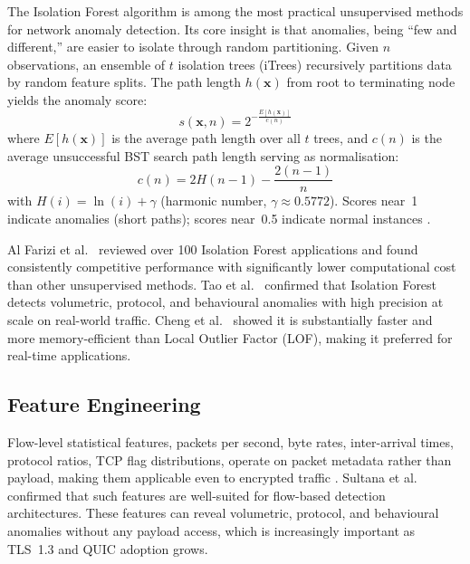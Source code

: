 \documentclass[conference]{IEEEtran}
\begin{document}
The Isolation Forest algorithm \cite{liu2008isolation} is among the most practical unsupervised methods for network anomaly detection. Its core insight is that anomalies, being ``few and different,'' are easier to isolate through random partitioning. Given $n$ observations, an ensemble of $t$ isolation trees (iTrees) recursively partitions data by random feature splits. The path length $h(\mathbf{x})$ from root to terminating node yields the anomaly score:
\begin{equation}
\label{eq:iforest_score}
s(\mathbf{x}, n) = 2^{-\frac{E[h(\mathbf{x})]}{c(n)}}
\end{equation}
where $E[h(\mathbf{x})]$ is the average path length over all $t$ trees, and $c(n)$ is the average unsuccessful BST search path length serving as normalisation:
\begin{equation}
\label{eq:cn}
c(n) = 2H(n-1) - \frac{2(n-1)}{n}
\end{equation}
with $H(i) = \ln(i) + \gamma$ (harmonic number, $\gamma \approx 0.5772$). Scores near~1 indicate anomalies (short paths); scores near~0.5 indicate normal instances \cite{liu2008isolation}.

Al Farizi et al.\ \cite{alfarizi2021isolation} reviewed over 100 Isolation Forest applications and found consistently competitive performance with significantly lower computational cost than other unsupervised methods. Tao et al.\ \cite{tao2018parallel} confirmed that Isolation Forest detects volumetric, protocol, and behavioural anomalies with high precision at scale on real-world traffic. Cheng et al.\ \cite{cheng2019outlier} showed it is substantially faster and more memory-efficient than Local Outlier Factor (LOF), making it preferred for real-time applications.

\subsection{Feature Engineering}

Flow-level statistical features, packets per second, byte rates, inter-arrival times, protocol ratios, TCP flag distributions, operate on packet metadata rather than payload, making them applicable even to encrypted traffic \cite{tao2018parallel, ahmad2021nids}. Sultana et al.\ \cite{sultana2019sdn} confirmed that such features are well-suited for flow-based detection architectures. These features can reveal volumetric, protocol, and behavioural anomalies without any payload access, which is increasingly important as TLS~1.3 and QUIC adoption grows.
\end{document}
